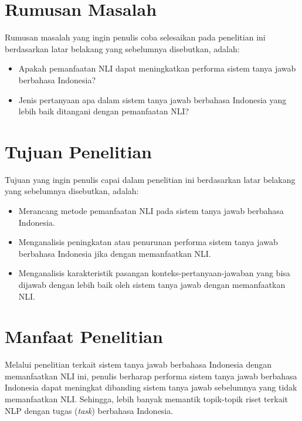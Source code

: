\section{Rumusan Masalah}
\label{1.2}
Rumusan masalah yang ingin penulis coba selesaikan pada penelitian ini berdasarkan latar belakang yang sebelumnya disebutkan, adalah:

\begin{itemize}

    \item Apakah pemanfaatan NLI dapat meningkatkan performa sistem tanya jawab berbahasa Indonesia?

    \item Jenis pertanyaan apa dalam sistem tanya jawab berbahasa Indonesia yang lebih baik ditangani dengan pemanfaatan NLI?
    
\end{itemize}

\section{Tujuan Penelitian}
\label{1.3}
Tujuan yang ingin penulis capai dalam penelitian ini berdasarkan latar belakang yang sebelumnya disebutkan, adalah:

\begin{itemize}

    \item Merancang metode pemanfaatan NLI pada sistem tanya jawab berbahasa Indonesia.

    \item Menganalisis peningkatan atau penurunan performa sistem tanya jawab berbahasa Indonesia jika dengan memanfaatkan NLI.

    \item Menganalisis karakteristik pasangan konteks-pertanyaan-jawaban yang bisa dijawab dengan lebih baik oleh sistem tanya jawab dengan memanfaatkan NLI.
    
\end{itemize}

\section{Manfaat Penelitian}
\label{1.4}
Melalui penelitian terkait sistem tanya jawab berbahasa Indonesia dengan memanfaatkan NLI ini, penulis berharap performa sistem tanya jawab berbahasa Indonesia dapat meningkat dibanding sistem tanya jawab sebelumnya yang tidak memanfaatkan NLI. Sehingga, lebih banyak memantik topik-topik riset terkait NLP dengan tugas (\emph{task}) berbahasa Indonesia.

